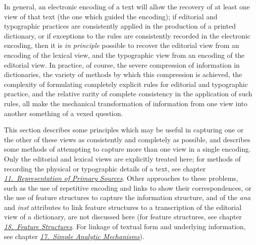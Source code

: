 In general, an electronic encoding of a text will allow the recovery of at least one view of that text (the one which guided the encoding); if editorial and typographic practices are consistently applied in the production of a printed dictionary, or if exceptions to the rules are consistently recorded in the electronic encoding, then it is \textit{in principle} possible to recover the editorial view from an encoding of the lexical view, and the typographic view from an encoding of the editorial view. In practice, of course, the severe compression of information in dictionaries, the variety of methods by which this compression is achieved, the complexity of formulating completely explicit rules for editorial and typographic practice, and the relative rarity of complete consistency in the application of such rules, all make the mechanical transformation of information from one view into another something of a vexed question.\par
This section describes some principles which may be useful in capturing one or the other of these views as consistently and completely as possible, and describes some methods of attempting to capture more than one view in a single encoding. Only the editorial and lexical views are explicitly treated here; for methods of recording the physical or typographic details of a text, see chapter \textit{\hyperref[PH]{11.\ Representation of Primary Sources}}. Other approaches to these problems, such as the use of repetitive encoding and links to show their correspondences, or the use of feature structures to capture the information structure, and of the {\itshape ana} and {\itshape inst} attributes to link feature structures to a transcription of the editorial view of a dictionary, are not discussed here (for feature structures, see chapter \textit{\hyperref[FS]{18.\ Feature Structures}}. For linkage of textual form and underlying information, see chapter \textit{\hyperref[AI]{17.\ Simple Analytic Mechanisms}}).
